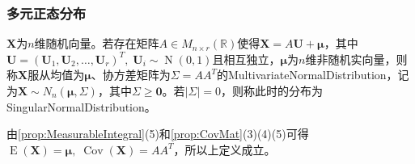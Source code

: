 \subsubsection{多元正态分布}
\begin{definition}\label{def:MultiNormal}
	$\mathbf{X}$为$n$维随机向量。若存在矩阵$A\in M_{n\times r}(\mathbb{R})$使得$\mathbf{X}=A\mathbf{U}+\boldsymbol{\mu}$，其中$\mathbf{U}=(\mathbf{U}_1,\mathbf{U}_2,\dots,\mathbf{U}_r)^T,\;\mathbf{U}_i\sim \operatorname{N}(0,1)$且相互独立，$\boldsymbol{\mu}$为$n$维非随机实向量，则称$\mathbf{X}$服从均值为$\boldsymbol{\mu}$、协方差矩阵为$\Sigma=AA^T$的\gls{MultivariateNormalDistribution}，记为$\mathbf{X}\sim N_n(\boldsymbol{\mu},\Sigma)$，其中$\Sigma\geqslant\mathbf{0}$。若$|\Sigma|=0$，则称此时的分布为\gls{SingularNormalDistribution}。
\end{definition}
\begin{note}
	由\cref{prop:MeasurableIntegral}(5)和\cref{prop:CovMat}(3)(4)(5)可得$\operatorname{E}(\mathbf{X})=\boldsymbol{\mu},\;\operatorname{Cov}(\mathbf{X})=AA^T$，所以上定义成立。
\end{note}
